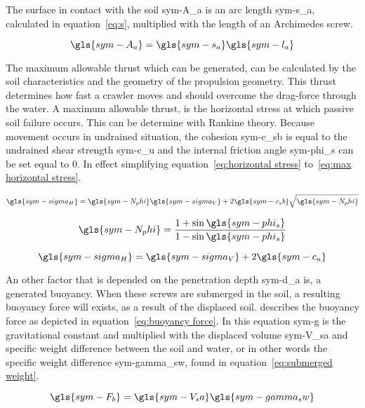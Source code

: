 \noindent The surface in contact with the soil \gls{sym-A_a} is an arc length \gls{sym-s_a}, calculated in
equation~\ref{eq:s}, multiplied with the length of an Archimedes screw.

\begin{equation}\label{eq:contact surface}
	\gls{sym-A_a}  = \gls{sym-s_a} \gls{sym-l_a}
\end{equation}

The maximum allowable thrust which can be generated, can be calculated by the soil characteristics and the geometry of
the propulsion geometry. This thrust determines how fast a crawler moves and should overcome the drag-force through the
water. A maximum allowable thrust, is the horizontal stress at which passive soil failure occurs. This can be determine
with Rankine theory. Because movement occurs in undrained situation, the cohesion \gls{sym-c_sb} is equal to the
undrained shear strength \gls{sym-c_u} and the internal friction angle \gls{sym-phi_s} can be set equal to \( 0 \). In
effect simplifying equation~\ref{eq:horizontal stress} to~\ref{eq:max horizontal stress}.

\begin{equation}\label{eq:horizontal stress}
	\gls{sym-sigma_H} = \gls{sym-N_phi} \gls{sym-sigma_V} + 2\gls{sym-c_sb}\sqrt{\gls{sym-N_phi}}
\end{equation}

\begin{equation}
	\gls{sym-N_phi} = \frac{1 + \sin \gls{sym-phi_s}}{1 - \sin \gls{sym-phi_s}}
\end{equation}

\begin{equation}\label{eq:max horizontal stress}
	\gls{sym-sigma_H} = \gls{sym-sigma_V} + 2\gls{sym-c_u}
\end{equation}

An other factor that is depended on the penetration depth \gls{sym-d_a} is, a generated buoyancy. When these screws are
submerged in the soil, a resulting buoyancy force will exists, as a result of the displaced soil.
\citet{lotman_applicable_2009} describes the buoyancy force as depicted in equation~\ref{eq:buoyancy force}. In this
equation \gls{sym-g} is the gravitational constant and multiplied with the displaced volume \gls{sym-V_sa} and specific
weight difference between the soil and water, or in other words the specific weight difference  \gls{sym-gamma_sw},
found in equation~\ref{eq:submerged weight}.

\begin{equation}\label{eq:buoyancy force}
	\gls{sym-F_b} = \gls{sym-V_sa} \gls{sym-gamma_sw}
\end{equation}

